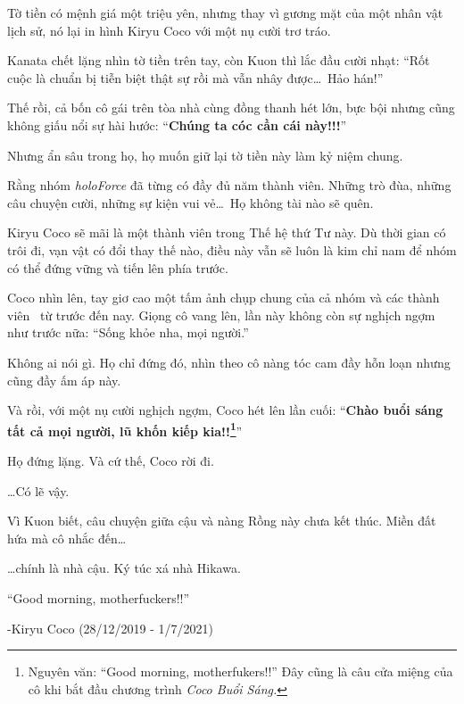 \documentclass[../main.tex]{subfiles}
\begin{document}
Tờ tiền có mệnh giá một triệu yên, nhưng thay vì gương mặt của một nhân vật lịch sử, nó lại in hình Kiryu Coco với một nụ cười trơ tráo.


Kanata chết lặng nhìn tờ tiền trên tay, còn Kuon thì lắc đầu cười nhạt: ``Rốt cuộc là chuẩn bị tiễn biệt thật sự rồi mà vẫn nhây được\dots\ Hảo hán!''

Thế rồi, cả bốn cô gái trên tòa nhà cùng đồng thanh hét lớn, bực bội nhưng cũng không giấu nổi sự hài hước: ``\textbf{Chúng ta cóc cần cái này!!!}''

Nhưng ẩn sâu trong họ, họ muốn giữ lại tờ tiền này làm kỷ niệm chung.

Rằng nhóm \textit{holoForce} đã từng có đầy đủ năm thành viên. Những trò đùa, những câu chuyện cười, những sự kiện vui vẻ\dots\ Họ không tài nào sẽ quên.

Kiryu Coco sẽ mãi là một thành viên trong Thế hệ thứ Tư này. Dù thời gian có trôi đi, vạn vật có đổi thay thế nào, điều này vẫn sẽ luôn là kim chỉ nam để nhóm có thể đứng vững và tiến lên phía trước.

Coco nhìn lên, tay giơ cao một tấm ảnh chụp chung của cả nhóm và các thành viên \hll\ từ trước đến nay. Giọng cô vang lên, lần này không còn sự nghịch ngợm như trước nữa: ``Sống khỏe nha, mọi người.''

Không ai nói gì. Họ chỉ đứng đó, nhìn theo cô nàng tóc cam đầy hỗn loạn nhưng cũng đầy ấm áp này.

Và rồi, với một nụ cười nghịch ngợm, Coco hét lên lần cuối: ``\textbf{Chào buổi sáng tất cả mọi người, lũ khốn kiếp kia!!\footnote{Nguyên văn: ``Good morning, motherfukers!!'' Đây cũng là câu cửa miệng của cô khi bắt đầu chương trình \textit{Coco Buổi Sáng.}}}''


Họ đứng lặng. Và cứ thế, Coco rời đi.

\dots Có lẽ vậy.

Vì Kuon biết, câu chuyện giữa cậu và nàng Rồng này chưa kết thúc. Miền đất hứa mà cô nhắc đến\dots

\dots chính là nhà cậu. Ký túc xá nhà Hikawa.

\il


``Good morning, motherfuckers!!''

\begin{flushright}
  -Kiryu Coco (28/12/2019 - 1/7/2021)
\end{flushright}
\end{document}
